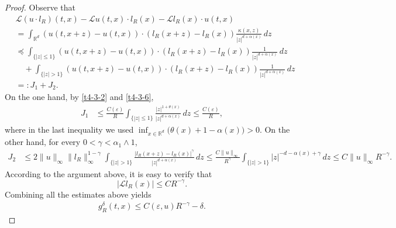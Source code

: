 \documentclass[a4paper,11pt]{amsart}
\renewcommand{\le}{\leqslant}
\newcommand{\R}{\mathds R}
\newcommand{\T}{\theta}
\newcommand{\p}{\preceq}
\newcommand{\K}{\kappa}
\newcommand{\A}{\alpha}
\newcommand{\G}{\gamma}
\newcommand{\e}{ \varepsilon}
\def\LL{{\mathcal L}}
\theoremstyle{definition}
\begin{document}
\begin{proof}
Observe that
\begin{align*}
& \LL(u\cdot l_R)(t,x)- \LL u(t,x)\cdot l_R(x)-\LL l_R(x)\cdot u(t,x)\\
&=\int_{\R^d}(u(t,x+z)-u(t,x))\cdot (l_R(x+z)-l_R(x))
\frac{\K(x,z)}{|z|^{d+\A(x)}}\,dz\\
&\p \int_{\{|z|\le 1\}}
(u(t,x+z)-u(t,x))\cdot (l_R(x+z)-l_R(x))
\frac{1}{|z|^{d+\A(x)}}\,dz\\
&\quad +\int_{\{|z|> 1\}}
(u(t,x+z)-u(t,x))\cdot (l_R(x+z)-l_R(x))
\frac{1}{|z|^{d+\A(x)}}\,dz\\
&=:J_1+J_2.
\end{align*}
On the one hand, by \eqref{t4-3-2} and \eqref{t4-3-6},
\begin{align*}
J_1&\le \frac{C(\e)}{R}\int_{\{|z|\le 1\}}
\frac{|z|^{1+\T(x)}}{|z|^{d+\A(x)}}\,dz\le \frac{C(\e)}{R},
\end{align*}
where in the last inequality we used $\inf_{x \in \R^d}\big(\T(x)+1-\A(x)\big)>0$.
On the other hand, for every $0<\G< \A_1\wedge 1$,
\begin{align*}
J_2&\le 2\|u\|_{\infty}\|l_R\|_{\infty}^{1-\G}
\int_{\{|z|>1\}}\frac{|l_R(x+z)-l_R(x)|^{\G}}{|z|^{d+\A(x)}}\,dz\le \frac{C\|u\|_{\infty}}{R^{\G}}\int_{\{|z|>1\}}
|z|^{-d-\A(x)+\G}\,dz\le C\|u\|_{\infty}R^{-\G}.
\end{align*}
According to the argument above, it is easy to verify that
$$
|\LL l_R(x)|\le CR^{-\G}.
$$
Combining all the estimates above yields
\begin{equation}\label{t4-3-6a}
\begin{split}
g_R^{\delta}(t,x)\le C(\e,u)R^{-\G}-\delta.
\end{split}
\end{equation}


\end{proof}
\end{document}

